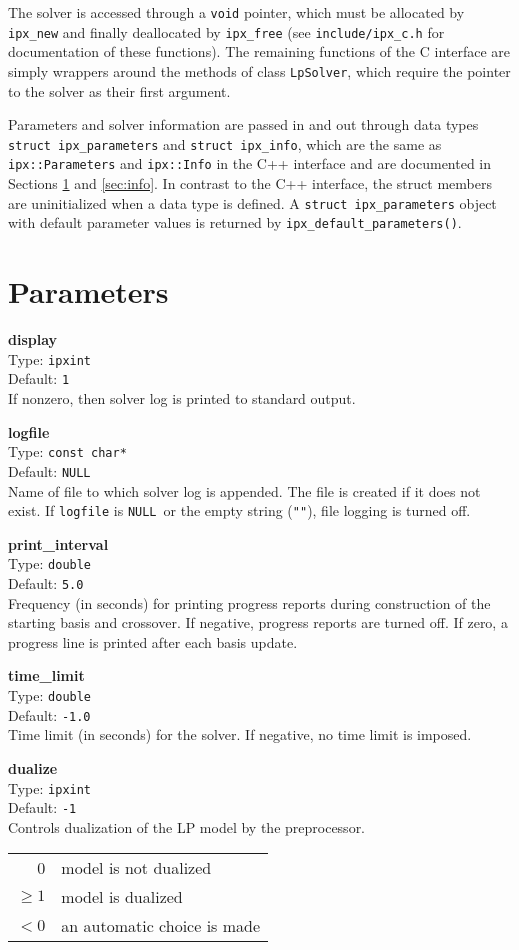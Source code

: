 \documentclass{article}
\newcommand{\ct}{\texttt}
\newcommand{\NULL}{\ct{NULL}}
\newcommand{\param}[4]{
  \noindent\begin{minipage}{\textwidth}
    \textbf{#1}\\
    Type: \ct{#2}\\
    Default: \ct{#3}\\
    #4
  \end{minipage}
  \vskip 1\baselineskip
}
\begin{document}
The solver is accessed through a \ct{void} pointer, which must be allocated by
\ct{ipx\_new} and finally deallocated by \ct{ipx\_free} (see
\ct{include/ipx\_c.h} for documentation of these functions). The remaining
functions of the C interface are simply wrappers around the methods of class
\ct{LpSolver}, which require the pointer to the solver as their first argument.

Parameters and solver information are passed in and out through data types
\ct{struct ipx\_parameters} and \ct{struct ipx\_info}, which are the same as
\ct{ipx::Parameters} and \ct{ipx::Info} in the C++ interface and are documented
in Sections \ref{sec:parameters} and \ref{sec:info}. In contrast to the C++
interface, the struct members are uninitialized when a data type is defined.
A \ct{struct ipx\_parameters} object with default parameter values is returned
by \ct{ipx\_default\_parameters()}.

\section{Parameters}
\label{sec:parameters}

\param{display}{ipxint}{1}{
  If nonzero, then solver log is printed to standard output.
}

\param{logfile}{const char*}{\NULL}{
  Name of file to which solver log is appended. The file is created if it does
  not exist. If \ct{logfile} is \NULL\ or the empty string (\ct{""}), file
  logging is turned off.
}

\param{print\_interval}{double}{5.0}{
  Frequency (in seconds) for printing progress reports during construction of
  the starting basis and crossover. If negative, progress reports are turned
  off. If zero, a progress line is printed after each basis update.
}

\param{time\_limit}{double}{-1.0}{
  Time limit (in seconds) for the solver. If negative, no time limit is
  imposed.
}

\param{dualize}{ipxint}{-1}{
  Controls dualization of the LP model by the preprocessor. \\
  \begin{tabular}{rl}
    0 & model is not dualized \\
    $\ge1$ & model is dualized \\
    $<0$ & an automatic choice is made
  \end{tabular}
}
\end{document}
